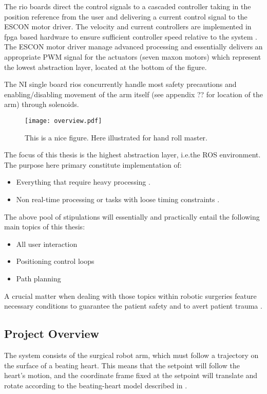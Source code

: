 The \gls{rio} boards direct the control signals to a cascaded controller taking in the position reference from the user and delivering a current control signal to the ESCON motor driver. The velocity and current controllers are implemented in \gls{fpga} based hardware to ensure sufficient controller speed relative to the system \citep{bib:robot_paper}. The ESCON motor driver manage advanced processing and essentially delivers an appropriate PWM signal for the actuators (seven maxon motors) which represent the lowest abstraction layer, located at the bottom of the figure.

The NI single board \glspl{rio} concurrently handle most safety precautions and enabling/disabling movement of the arm itself (see appendix ?? for location of the arm) through solenoids.
\begin{figure}[H]
	\center
		\texttt{[image: overview.pdf]}	\caption{This is a nice figure. Here illustrated for hand roll master.}
	\label{fig:overview}
\end{figure}
The focus of this thesis is the highest abstraction layer, i.e.the ROS environment. The purpose here primary constitute implementation of:
\begin{itemize}
\item Everything that require heavy processing \citep{bib:robot_paper}.
\item Non real-time processing or tasks with loose timing constraints \citep{bib:robot_paper}.
\end{itemize}
The above pool of stipulations will essentially and practically entail the following main topics of this thesis:
\begin{itemize}
\item All user interaction
\item Positioning control loops
\item Path planning
\end{itemize}
A crucial matter when dealing with those topics within robotic surgeries feature necessary conditions to guarantee the patient safety and to avert patient trauma \citep{bib:safety}.


\subsection{Project Overview}\label{sec:project_overview}
The system consists of the surgical robot arm, which must follow a trajectory on the surface of a beating heart. This means that the setpoint will follow the heart's motion, and the coordinate frame fixed at the setpoint will translate and rotate according to the beating-heart model described in \citep{bib:heart_model,bib:safety}.

